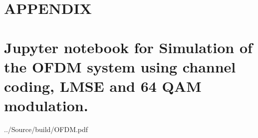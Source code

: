 \section*{APPENDIX}
\setcounter{section}{1}
\setcounter{subsection}{0}
\section*{Jupyter notebook for Simulation of the OFDM system using channel
coding, LMSE and 64 QAM modulation.}


{../Source/build/OFDM.pdf}